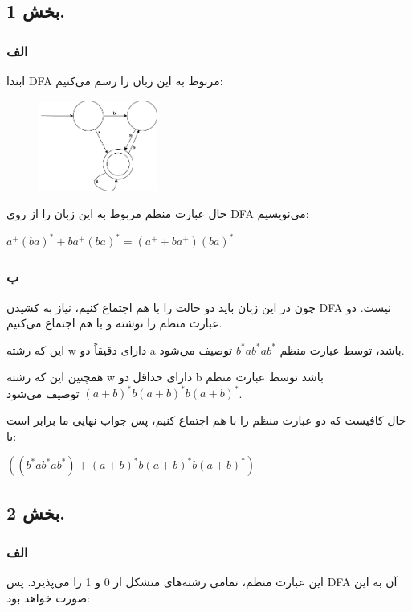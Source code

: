 \subsection*{بخش 1.}
\subsubsection*{الف}
ابتدا DFA مربوط به این زبان را رسم می‌کنیم:
\begin{figure}[htbp]
	\centering
	\includegraphics[width=0.35\textwidth]{q3s1p1.png}
\end{figure}

حال عبارت منظم مربوط به این زبان را از روی DFA می‌نویسیم:
\setLTR

{\large \textbf{$a^+(ba)^* + ba^+(ba)^* = (a^+ + ba^+)(ba)^*$}}

\setRTL

\subsubsection*{ب}

چون در این زبان باید دو حالت را با هم اجتماع کنیم، نیاز به کشیدن DFA نیست. دو عبارت منظم را نوشته و با هم اجتماع می‌کنیم.

این که رشته w دارای دقیقاً دو a باشد، توسط عبارت منظم  
{\Large \textbf{$b^*ab^*ab^*$}}
توصیف می‌شود.

همچنین این که رشته w دارای حداقل دو b باشد توسط عبارت منظم
{\Large \textbf{$(a+b)^*b(a+b)^*b(a+b)^*$}}
توصیف می‌شود.

حال کافیست که دو عبارت منظم را با هم اجتماع کنیم، پس جواب نهایی ما برابر است با:

\setLTR

{\Large \textbf{$(   (b^*ab^*ab^*)+(a+b)^*b(a+b)^*b(a+b)^*   )$}}

\setRTL


\subsection*{بخش 2.}
\subsubsection*{الف}
این عبارت منظم، تمامی رشته‌های متشکل از 0 و 1 را می‌پذیرد. پس DFA آن به این صورت خواهد بود:

